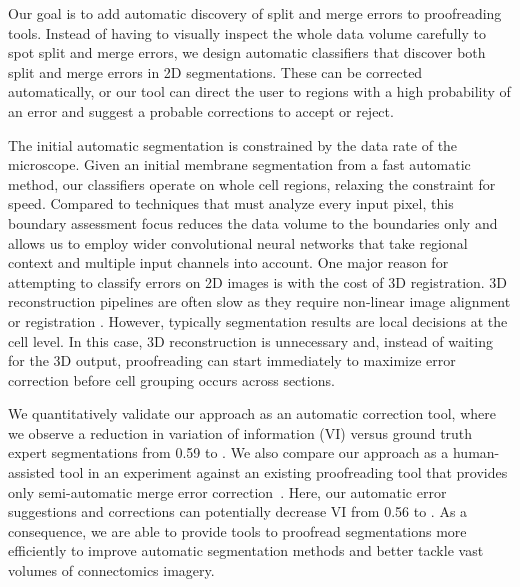 Our goal is to add automatic discovery of split and merge errors to proofreading tools. Instead of having to visually inspect the whole data volume carefully to spot split and merge errors, we design automatic classifiers that discover both split and merge errors in 2D segmentations. These can be corrected automatically, or our tool can direct the user to regions with a high probability of an error and suggest a probable corrections to accept or reject.

The initial automatic segmentation is constrained by the data rate of the microscope. Given an initial membrane segmentation from a fast automatic method, our classifiers operate on whole cell regions, relaxing the constraint for speed. Compared to techniques that must analyze every input pixel, this boundary assessment focus reduces the data volume to the boundaries only and allows us to employ wider convolutional neural networks that take regional context and multiple input channels into account. One major reason for attempting to classify errors on 2D images is with the cost of 3D registration. 3D reconstruction pipelines are often slow as they require non-linear image alignment or registration \cite{akselrod09,beyer13,Saalfeld2010Asrigidaspossible}. However, typically segmentation results are local decisions at the cell level. In this case, 3D reconstruction is unnecessary and, instead of waiting for the 3D output, proofreading can start immediately to maximize error correction before cell grouping occurs across sections.

We quantitatively validate our approach as an automatic correction tool, where we observe a reduction in variation of information (VI) versus ground truth expert segmentations from 0.59 to . We also compare our approach as a human-assisted tool in an experiment against an existing proofreading tool that provides only semi-automatic merge error correction~\cite{haehn_dojo_2014}. Here, our automatic error suggestions and corrections can potentially decrease VI from 0.56 to . As a consequence, we are able to provide tools to proofread segmentations more efficiently to improve automatic segmentation methods and better tackle vast volumes of connectomics imagery.

%
%
